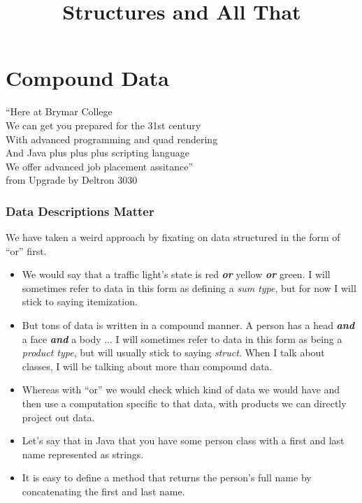 \documentclass{beamer}
\title{Structures and All That}
\begin{document}
\begin{frame}
\titlepage
\end{frame}
\section{Compound Data}

\begin{frame}
``Here at Brymar College\\
We can get you prepared for the 31st century\\
With advanced programming and quad rendering\\
And Java plus plus plus scripting language\\
We offer advanced job placement assitance''\\
from Upgrade by Deltron 3030  
\end{frame}

\begin{frame}
  \frametitle{Data Descriptions Matter}
  We have taken a weird approach by fixating on data structured in the form of ``or'' first.
  \begin{itemize}
  \item<2-> We would say that a traffic light's state is red \textbf{\emph{or}} yellow \textbf{\emph{or}} green. I will sometimes refer to data
    in this form as defining a \emph{sum type}, but for now I will stick to saying itemization.
  \item<3-> But tons of data is written in a compound manner. A person has a head \textbf{\emph{and}} a face \textbf{\emph{and}} a body ...
    I will sometimes refer to data in this form as being a \emph{product type}, but will usually stick to saying \emph{struct}.
    When I talk about classes, I will be talking about more than compound data.
  \item<4-> Whereas with ``or'' we would check which kind of data we would have and then use a computation specific to that data, with
    products we can directly project out data.
  \item<5-> Let's say that in Java that you have some person class with a first and last name represented as strings.
  \item<6-> It is easy to define a method that returns the person's full name by concatenating the first and last name.
  \end{itemize}
\end{frame}
\end{document}
